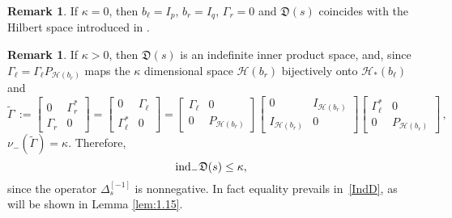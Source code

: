 \documentclass[12pt,twoside,a4paper]{amsart}
\theoremstyle{definition}
\newtheorem{remark}[thm]{Remark}
\numberwithin{equation}{section}
\begin{document}
\begin{remark}\label{rem:1.16}
If $\kappa=0$, then $b_\ell=I_p$, $b_r=I_q$, $\Gamma_r=0$ and  ${{\mathfrak D}}(s)$
coincides with the Hilbert space introduced in \cite{dBR}.
\end{remark}

\begin{remark}\label{rem:1.17}
If $\kappa>0$, then  ${{\mathfrak D}}(s)$ is an indefinite inner
product space, and, since $\Gamma_\ell= \Gamma_\ell P_{{{\mathcal H}}(b_r)}$
maps the $\kappa$ dimensional space ${{\mathcal H}}(b_r)$ bijectively onto
${{\mathcal H}}_*(b_\ell)$ and
$$
{{{\widetilde \Gamma} }}\,:=\begin{bmatrix}0 &\Gamma_r^*\\ \Gamma_r &
0\end{bmatrix}=\begin{bmatrix}0 &\Gamma_{\ell}\\ \Gamma_{\ell}^* &
0\end{bmatrix}=
\begin{bmatrix}\Gamma_{\ell} & 0\\ 0 & P_{{{\mathcal H}}(b_r)}\end{bmatrix}
\begin{bmatrix}0 & I_{{{\mathcal H}}(b_r)}\\ I_{{{\mathcal H}}(b_r)} & 0\end{bmatrix}
\begin{bmatrix}\Gamma_{\ell}^* & 0\\ 0 & P_{{{\mathcal H}}(b_r)}\end{bmatrix}\,,
$$
$\nu_-({{{\widetilde \Gamma} }})=\kappa$. Therefore,
\begin{equation}\label{IndD}
    \textup{ind}_-{{\mathfrak D}}(s)\le\kappa,
\end{equation}
since the operator $\Delta_s^{[-1]}$ is nonnegative. In fact
equality prevails in~\eqref{IndD}, as will be shown in Lemma
\ref{lem:1.15}.
\end{remark}
\end{document}
